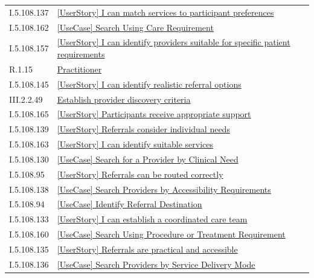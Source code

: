 \begin{longtable}{p{.22\linewidth}p{.73\linewidth}}
I.5.108.137 & \hyperref[element:2e5c9b7fd311466c9d57fbcc0d4d1aa4]{[UserStory] I can match services to participant preferences} \\
I.5.108.162 & \hyperref[element:331d8781b68c41f0bbedb8eda6229c16]{[UseCase] Search Using Care Requirement} \\
I.5.108.157 & \hyperref[element:3729723a57604f018feb0aeceb0d15f1]{[UserStory] I can identify providers suitable for specific patient requirements} \\
R.1.15 & \hyperref[element:49480591b4554983aaa82a79c1568bf3]{Practitioner} \\
I.5.108.145 & \hyperref[element:49b2ccf0b9f648439dd2afb5e87f66a1]{[UserStory] I can identify realistic referral options} \\
III.2.2.49 & \hyperref[element:4b20709f112540978fc6dafd6c85beed]{Establish provider discovery criteria} \\
I.5.108.165 & \hyperref[element:52387a3fd4b74d84a3bd9077d98df031]{[UserStory] Participants receive appropriate support} \\
I.5.108.139 & \hyperref[element:52917d7015c34e72a9eefcebbd2e0037]{[UserStory] Referrals consider individual needs} \\
I.5.108.163 & \hyperref[element:638dbdad8ff44868a08122f053220db8]{[UserStory] I can identify suitable services} \\
I.5.108.130 & \hyperref[element:6c2b10391d724991bdd8fc0883d9adf6]{[UseCase] Search for a Provider by Clinical Need} \\
I.5.108.95 & \hyperref[element:6f32e43829e1469d8cebe3e9a76f3324]{[UserStory] Referrals can be routed correctly} \\
I.5.108.138 & \hyperref[element:7e3afec610e3402786bc4b054c2f5613]{[UseCase] Search Providers by Accessibility Requirements} \\
I.5.108.94 & \hyperref[element:8164ea457c44458e9886daf87212c8ed]{[UseCase] Identify Referral Destination} \\
I.5.108.133 & \hyperref[element:81b82abdf5e54928a7d1ae4e4578a6cd]{[UserStory] I can establish a coordinated care team} \\
I.5.108.160 & \hyperref[element:8501336729974045a3a534734ba86a90]{[UseCase] Search Using Procedure or Treatment Requirement} \\
I.5.108.135 & \hyperref[element:861a4efae7434973bbbea79865fece34]{[UserStory] Referrals are practical and accessible} \\
I.5.108.136 & \hyperref[element:88ff8b2cc29b40ffab1cdce897b5af78]{[UseCase] Search Providers by Service Delivery Mode} \\

\end{longtable}
